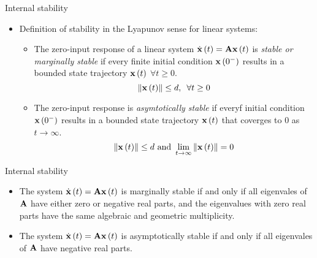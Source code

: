 \documentclass[aspectratio=169]{beamer}
\def\mf{\ensuremath\mathbf}
\def\lp{\ensuremath\left(}
\def\rp{\ensuremath\right)}
\def\lV{\ensuremath\left\lVert}
\def\rV{\ensuremath\right\rVert}
\newcommand{\ct}[1]{\lp #1\rp}
\begin{document}
\begin{frame}[t]{Internal stability}
\begin{itemize}
    \item Definition of stability in the Lyapunov sense for linear systems: 
    \begin{itemize}
      \item The zero-input response of a linear system $\dot{\mf{x}}\ct{t} = \mf{A}\mf{x}\ct{t}$ is \textit{stable or marginally stable} if every finite initial condition $\mf{x}\ct{0^-}$ results in a bounded state trajectory $\mf{x}\ct{t}$ $\forall t \geq 0$.
      \[ \lV \mf{x}\ct{t}\rV \leq d, \,\,\, \forall t \geq 0 \]

      \item The zero-input response is \textit{asymtotically stable} if everyf initial condition $\mf{x}\ct{0^-}$ results in a bounded state trajectory $\mf{x}\ct{t}$ that coverges to $0$ as $t \to \infty$.
      \[ \lV \mf{x}\ct{t}\rV \leq d \text{ and } \lim_{t \to \infty} \lV \mf{x}\ct{t}\rV = 0 \]
    \end{itemize}
\end{itemize}
\end{frame}


\begin{frame}[t]{Internal stability}
\begin{itemize}
    \item The system $\dot{\mf{x}}\ct{t} = \mf{A}\mf{x}\ct{t}$ is marginally stable if and only if all eigenvales of $\mf{A}$ have either zero or negative real parts, and the eigenvalues with zero real parts have the same algebraic and geometric multiplicity.

    \item  The system $\dot{\mf{x}}\ct{t} = \mf{A}\mf{x}\ct{t}$ is asymptotically stable if and only if all eigenvales of $\mf{A}$ have  negative real parts.
\end{itemize}
\end{frame}
\end{document}
